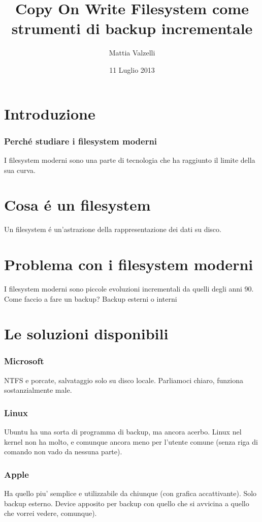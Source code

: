 \documentclass{beamer}
\title[COW Filesystem]{Copy On Write Filesystem come strumenti di backup incrementale}
\author[Mattia Valzelli]{Mattia Valzelli}
\institute[Univr]{Universit\`{a} degli studi di Verona}
\date{11 Luglio 2013}
\begin{document}
\begin{frame}
\titlepage
\end{frame}
\section{Introduzione} %
\begin{frame} %
\frametitle{Perch\'e studiare i filesystem moderni} %
I filesystem moderni sono una parte di tecnologia che ha raggiunto il limite della sua curva.
\end{frame}

\section{Cosa \'e un filesystem}
\begin{frame}
Un filesystem \'e un'astrazione della rappresentazione dei dati su disco.
\end{frame}

\section{Problema con i filesystem moderni}
\begin{frame}
I filesystem moderni sono piccole evoluzioni incrementali da quelli degli anni 90.
Come faccio a fare un backup?
Backup esterni o interni
\end{frame}

\section{Le soluzioni disponibili}
\begin{frame}
\frametitle{Microsoft}
NTFS e porcate, salvataggio solo su disco locale. Parliamoci chiaro, funziona sostanzialmente male.
\end{frame}
\begin{frame}
\frametitle{Linux}
Ubuntu ha una sorta di programma di backup, ma ancora acerbo. Linux nel kernel non ha molto, e comunque ancora meno per l'utente comune (senza riga di comando non vado da nessuna parte).
\end{frame}

\begin{frame}
\frametitle{Apple}
Ha quello piu' semplice e utilizzabile da chiunque (con grafica accattivante). Solo backup esterno. Device apposito per backup con quello che si avvicina a quello che vorrei vedere, comunque).
\end{frame}
\end{document}
